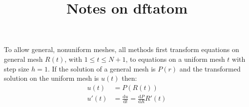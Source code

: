 \documentclass[a4paper,11pt,bahasa]{article} %
\begin{document}
\title{%
Notes on dftatom
}
\author{}
\date{}
\maketitle


To allow general, nonuniform meshes, all methods first transform equations
on general mesh $R(t)$, with $1 \leq t \leq N + 1$, to equations on a uniform mesh $t$
with step size $h = 1$.
If the solution of a general mesh is $P(r)$ and the transformed solution on the uniform mesh
is $u(t)$ then:
\begin{align}
u(t) & = P(R(t)) \\
u'(t) & = \frac{\mathrm{d}u}{\mathrm{d}t} = \frac{\mathrm{d}P}{\mathrm{d}R} R'(t)
\end{align}
\end{document}
